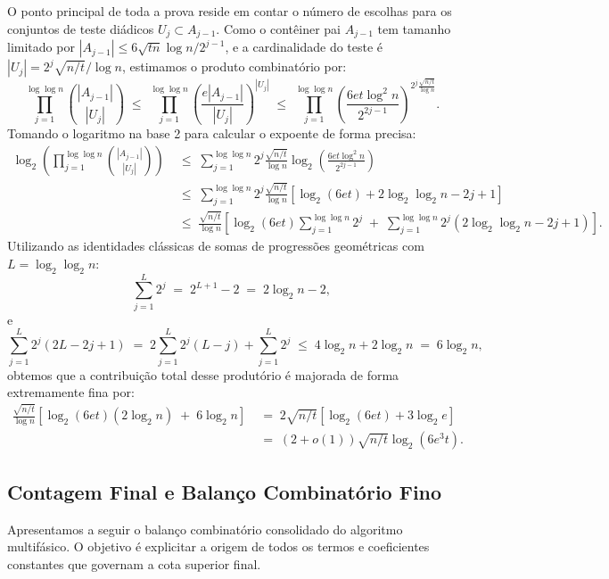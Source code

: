 \documentclass[reqno,a4paper,12pt]{amsart}
\begin{document}
O ponto principal de toda a prova reside em contar o número de escolhas para os conjuntos de teste diádicos $U_j \subset A_{j-1}$. Como o contêiner pai $A_{j-1}$ tem tamanho limitado por $|A_{j-1}| \leq 6\sqrt{t n}\log n / 2^{j-1}$, e a cardinalidade do teste é $|U_j| = 2^j \sqrt{n/t} / \log n$, estimamos o produto combinatório por:
\[
  \prod_{j=1}^{\log\log n} \binom{|A_{j-1}|}{|U_j|} \;\leq\; \prod_{j=1}^{\log\log n} \left( \frac{e |A_{j-1}|}{|U_j|} \right)^{|U_j|} \;\le\; \prod_{j=1}^{\log\log n} \left( \frac{6e t \log^2 n}{2^{2j-1}} \right)^{2^j \frac{\sqrt{n/t}}{\log n}}.
\]
Tomando o logaritmo na base 2 para calcular o expoente de forma precisa:
\begin{align*}
  \log_2 \left( \prod_{j=1}^{\log\log n} \binom{|A_{j-1}|}{|U_j|} \right)
   & \;\leq\; \sum_{j=1}^{\log\log n} 2^j \frac{\sqrt{n/t}}{\log n} \log_2 \left( \frac{6e t \log^2 n}{2^{2j-1}} \right)                                      \\
   & \;\leq\; \sum_{j=1}^{\log\log n} 2^j \frac{\sqrt{n/t}}{\log n} \left[ \log_2(6e t) + 2\log_2\log_2 n - 2j + 1 \right]                                    \\
   & \;\leq\; \frac{\sqrt{n/t}}{\log n} \left[ \log_2(6e t) \sum_{j=1}^{\log\log n} 2^j \;+\; \sum_{j=1}^{\log\log n} 2^j (2\log_2\log_2 n - 2j + 1) \right].
\end{align*}
Utilizando as identidades clássicas de somas de progressões geométricas com $L = \log_2\log_2 n$:
\[
  \sum_{j=1}^L 2^j \;=\; 2^{L+1} - 2 \;=\; 2\log_2 n - 2,
\]
e
\[
  \sum_{j=1}^L 2^j (2L - 2j + 1) \;=\; 2 \sum_{j=1}^L 2^j (L-j) + \sum_{j=1}^L 2^j \;\leq\; 4 \log_2 n + 2 \log_2 n \;=\; 6 \log_2 n,
\]
obtemos que a contribuição total desse produtório é majorada de forma extremamente fina por:
\begin{align*}
  \frac{\sqrt{n/t}}{\log n} \left[ \log_2(6e t) (2\log_2 n) \;+\; 6 \log_2 n \right] \; & =\; 2\sqrt{n/t} \left[ \log_2(6e t) + 3 \log_2 e \right] \\
                                                                                        & =\; (2 + o(1)) \sqrt{n/t} \log_2(6e^3 t).
\end{align*}
\subsection{Contagem Final e Balanço Combinatório Fino}
\label{subsec:balanco-fino}

Apresentamos a seguir o balanço combinatório consolidado do algoritmo multifásico. O objetivo é explicitar a origem de todos os termos e coeficientes constantes que governam a cota superior final.
\end{document}
